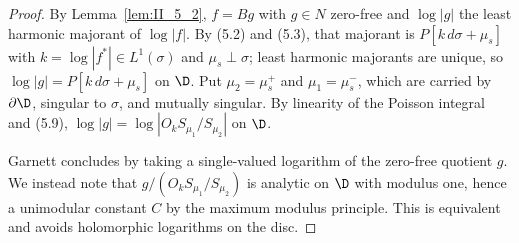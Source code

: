 \begin{proof}
  \leanok
  By Lemma~\ref{lem:II_5_2}, $f=Bg$ with $g\in N$ zero-free and $\log|g|$ the
  least harmonic majorant of $\log|f|$. By (5.2) and (5.3), that majorant is
  $P[k\,d\sigma+\mu_s]$ with $k=\log|f^*|\in L^1(\sigma)$ and
  $\mu_s\perp\sigma$; least harmonic majorants are unique, so
  $\log|g|=P[k\,d\sigma+\mu_s]$ on $\D$. Put $\mu_2=\mu_s^+$ and
  $\mu_1=\mu_s^-$, which are carried by $\partial\D$, singular to $\sigma$,
  and mutually singular. By linearity of the Poisson integral and (5.9),
  $\log|g|=\log|O_k S_{\mu_1}/S_{\mu_2}|$ on $\D$.

  Garnett concludes by taking a single-valued logarithm of the zero-free
  quotient $g$. We instead note that $g/(O_k S_{\mu_1}/S_{\mu_2})$ is analytic
  on $\D$ with modulus one, hence a unimodular constant $C$ by the maximum
  modulus principle. This is equivalent and avoids holomorphic logarithms on
  the disc.
\end{proof}

